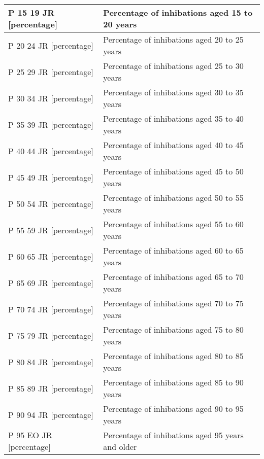 \documentclass[a4paper,twoside,11pt]{article}
\begin{document}
\begin{center}
\begin{tabular}{ | p{4.9cm} | p{10cm} |}
        P 15 19 JR [percentage] & Percentage of inhibations aged 15 to 20 years \\ \hline
        P 20 24 JR [percentage] & Percentage of inhibations aged 20 to 25 years \\ \hline
        P 25 29 JR [percentage] & Percentage of inhibations aged 25 to 30 years \\ \hline
        P 30 34 JR [percentage] & Percentage of inhibations aged 30 to 35 years \\ \hline
        P 35 39 JR [percentage] & Percentage of inhibations aged 35 to 40 years \\ \hline
        P 40 44 JR [percentage] & Percentage of inhibations aged 40 to 45 years \\ \hline
        P 45 49 JR [percentage] & Percentage of inhibations aged 45 to 50 years \\ \hline
        P 50 54 JR [percentage] & Percentage of inhibations aged 50 to 55 years \\ \hline
        P 55 59 JR [percentage] & Percentage of inhibations aged 55 to 60 years \\ \hline
        P 60 65 JR [percentage] & Percentage of inhibations aged 60 to 65 years \\ \hline
        P 65 69 JR [percentage] & Percentage of inhibations aged 65 to 70 years \\ \hline
        P 70 74 JR [percentage] & Percentage of inhibations aged 70 to 75 years \\ \hline
        P 75 79 JR [percentage] & Percentage of inhibations aged 75 to 80 years \\ \hline
        P 80 84 JR [percentage] & Percentage of inhibations aged 80 to 85 years \\ \hline
        P 85 89 JR [percentage] & Percentage of inhibations aged 85 to 90 years \\ \hline
        P 90 94 JR [percentage] & Percentage of inhibations aged 90 to 95 years \\ \hline
        P 95 EO JR [percentage] & Percentage of inhibations aged 95 years and older \\ \hline
    \end{tabular}
\end{center}
\end{document}
